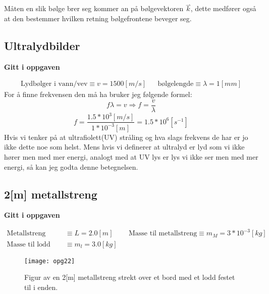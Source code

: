 \documentclass[a4paper,12pt,norsk]{article}
\newcommand{\ov}{\overset}
\begin{document}
Måten en slik bølge brer seg kommer an på bølgevektoren $\ov{\rightharpoonup}{k}$,  dette medfører også at den bestemmer hvilken retning bølgefrontene beveger seg.

\subsection{Ultralydbilder}
\begin{center}
\textbf{Gitt i oppgaven}
\end{center}
\begin{align*}
\text{Lydbølger i vann/vev} \equiv v = 1500[m/s] && \text{bølgelengde} \equiv \lambda = 1[mm]
\end{align*}
For å finne frekvensen den må ha bruker jeg følgende formel:
$$
f\lambda = v \Rightarrow f = \frac{v}{\lambda}
$$
$$
f = \frac{1.5*10^3[m/s]}{1*10^{-3}[m]} = 1.5*10^6[s^{-1}]
$$
Hvis vi tenker på at ultrafiolett(UV) stråling og hva slags frekvens de har er jo ikke dette noe som helst. Mens hvis vi definerer at ultralyd er lyd som vi ikke hører men med mer energi, analogt med at UV lys er lys vi ikke ser men med mer energi, så kan jeg godta denne betegnelsen. 

\subsection{2[m] metallstreng}
\begin{center}
\textbf{Gitt i oppgaven}
\end{center}
\begin{align*}
\text{Metallstreng lengde} &\equiv L = 2.0 [m] && \text{Masse til metallstreng} \equiv m_M = 3*10^{-3}[kg]\\
\text{Masse til lodd} &\equiv m_l = 3.0 [kg] 
\end{align*}

\begin{figure}
\centering
\texttt{[image: opg22]}
\caption[Figur til 2m metallstreng strekt over et bord]{Figur av en 2[m] metallstreng strekt over et bord med et lodd festet til i enden.}
\label{opg22}
\end{figure}
\end{document}
